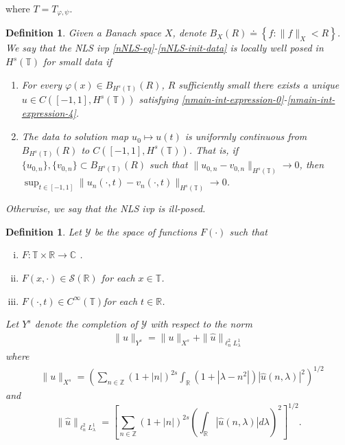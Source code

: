 \documentclass[12pt,reqno]{amsart}
\numberwithin{equation}{section}  %
\newcommand{\rr}{\mathbb{R}}
\newcommand{\zz}{\mathbb{Z}}
\newcommand{\cc}{\mathbb{C}}
\newcommand{\ci}{\mathbb{T}}
\newcommand{\wh}{\widehat}
\newcommand{\vp}{\varphi}
\newtheorem{definition}[theorem]{Definition}
\begin{document}
%
%
where $T = T_{\vp, \psi}$. 
\begin{definition}
  Given a Banach space $X$, denote $B_{X}(R) \doteq \left\{ f: \| f \|_{X} < R
  \right\}$. We say that the NLS ivp
  \eqref{nNLS-eq}-\eqref{nNLS-init-data} is
	\emph{locally well posed in
  $H^s(\ci)$ for small data} if 
	\begin{enumerate}
    \item For every $\vp(x) \in B_{H^{s}(\ci)}(R)$, $R$ sufficiently small
      there exists a unique $u \in C([-1,
      1], H^s(\ci))$ satisfying
      \eqref{nmain-int-expression-0}-\eqref{nmain-int-expression-4}.
    \item
      The data to solution map $u_0 \mapsto u(t)$ is uniformly continuous from
      $B_{H^{s}(\ci)}(R)$ 
      to $C(\left[ -1, 1 \right], H^s(\ci))$. That is, if
      $\{u_{0,n} \}, \{v_{0,n}\} \subset B_{H^{s}(\ci)}(R)$ such that $\|u_{0,n} -
      v_{0,n} \|_{H^{s}(\ci)} \to 0$, then 
      $\sup_{t \in [-1, 1]}
      \|u_{n}(\cdot, t) - v_{n}(\cdot, t) \|_{H^s(\ci)} \to 0$.
  \end{enumerate}
	Otherwise, we say that the NLS ivp is \emph{ill-posed}.
\end{definition}
%
\begin{definition}
  Let $\mathcal{Y}$ be the space of functions $F(\cdot)$ such that
  \begin{enumerate}[(i)]
   \item{$F: \ci \times \rr \to \cc$ }.
   \item{ $F(x, \cdot) \in \mathcal{S}(\rr)$ for each $x \in \ci$}.
   \item{ $F(\cdot, t) \in C^{\infty}(\ci)$for each $t \in \rr$}.
  \end{enumerate}
  Let $Y^{s}$ denote the completion of $\mathcal{Y}$ with
  respect to the norm
  \begin{equation}
	\label{nY-s-norm}
	\begin{split}
		\|u\|_{Y^s} = \|u\|_{X^s} + \|\wh{u}\|_{ \ell^2_n L^1_\lambda }
	\end{split}
\end{equation}
    where
\begin{equation}
	\label{nX^s-norm}
	\begin{split}
		& \|u\|_{X^s}
		= \left ( \sum_{n\in \zz} \left (1 + |n| \right )^{2s} \int_\rr \left ( 1 + | 
		\lambda - n^{2} | \right ) | \wh{u} ( n, \lambda ) |^2
		\right )^{1/2}
	\end{split}
\end{equation}
and
%
%
\begin{equation}
	\label{nE-norm}
	\|\wh{u}\|_{ \ell^2_n L^1_\lambda } = \left[ \sum_{n \in \zz}(1 + | n |)^{2s} \left(
	\int_{\rr}| \wh{u}(n, \lambda) |d \lambda \right)^{2} \right]^{1/2}.
\end{equation}
  \end{definition}
\end{document}

